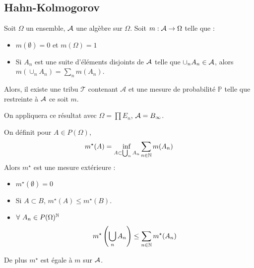 \documentclass{cours}
\begin{document}
        \subsection{Hahn-Kolmogorov}
            \begin{theorem}
                Soit $\Omega$ un ensemble, $\mathcal{A}$ une algèbre sur $\Omega$.
                Soit $m : \mathcal{A} \rightarrow \Omega$ telle que : 
                \begin{itemize}
                    \item $m(\emptyset) = 0$ et $m(\Omega) = 1$
                    \item Si $A_{n}$ est une suite d'éléments disjoints de $\mathcal{A}$ telle que $\cup_{n} A_{n} \in \mathcal{A}$, alors $m\left(\cup_{n} A_{n}\right) = \sum_{n} m(A_{n})$.
                \end{itemize}
                Alors, il existe une tribu $\mathcal{T}$ contenant $\mathcal{A}$ et une mesure de probabilité $\mathbb{P}$ telle que restreinte à $\mathcal{A}$ ce soit $m$.
            \end{theorem}
            \begin{remark}
                On appliquera ce résultat avec $\Omega = \prod E_{n}$, $\mathcal{A} = B_{\infty}$.
            \end{remark}

            \begin{lemma}
                On définit pour $A \in P(\Omega)$, \[m^{\star}(A) = \inf_{A \subset \bigcup_{n} A_{n}} \sum_{n \in \mathbb{N}} m(A_{n})\]
                Alors $m^{\star}$ est une mesure extérieure :
                \begin{itemize}
                    \item $m^{\star}(\emptyset) = 0$
                    \item Si $A \subset B$, $m^{\star}(A) \leq m^{\star}(B)$.
                    \item $\forall \ A_{n} \in P(\Omega)^{\mathbb{N}}$ \[
                        m^{\star}\left(\bigcup_{n} A_{n}\right) \leq \sum_{n \in \mathbb{N}} m^{\star}(A_{n})
                    \]
                \end{itemize}
                De plus $m^{\star}$ est égale à $m$ sur $\mathcal{A}$.
            \end{lemma}

        
\end{document}
